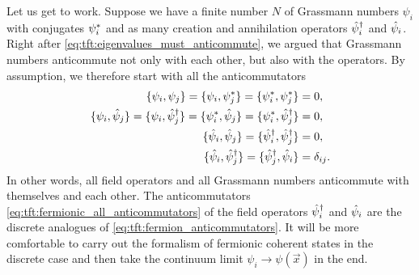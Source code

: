 Let us get to work.
Suppose we have a finite number $N$ of Grassmann numbers $\psi_i$ with conjugates ${\psi}^*_i$ and as many creation and annihilation operators $\hat\psi^\dagger_i$ and $\hat\psi_i$.
Right after \cref{eq:tft:eigenvalues_must_anticommute}, we argued that Grassmann numbers anticommute not only with each other, but also with the operators.
By assumption, we therefore start with all the anticommutators
\begin{equation}
\begin{split}
	\{ \psi_i , \psi_j \} = \{ \psi_i , {\psi}^*_j \} = \{ {\psi}^*_i , {\psi}^*_j \}                             &= 0            , \\
	\{ \psi_i , \hat\psi_j \} = \{ \psi_i , \hat\psi^\dagger_j \} = \{ {\psi}^*_i , \hat\psi_j \} = \{ {\psi}^*_i , \hat\psi^\dagger_j \} &= 0            , \\
	\{ \hat\psi_i , \hat\psi_j \} = \{ \hat\psi^\dagger_i , \hat\psi^\dagger_j \}                                                             &= 0            , \\
	\{ \hat\psi_i , \hat\psi^\dagger_j \} = \{ \hat\psi^\dagger_j , \hat\psi_i \}                                                             &= \delta_{i j} . \\
\end{split}
\label{eq:tft:fermionic_all_anticommutators}
\end{equation}
In other words, all field operators and all Grassmann numbers anticommute with themselves and each other.
The anticommutators \eqref{eq:tft:fermionic_all_anticommutators} of the field operators $\hat\psi^\dagger_i$ and $\hat\psi_i$ are the discrete analogues of \eqref{eq:tft:fermion_anticommutators}.
It will be more comfortable to carry out the formalism of fermionic coherent states in the discrete case and then take the continuum limit $\psi_i \rightarrow \psi(\vec{x})$ in the end.

